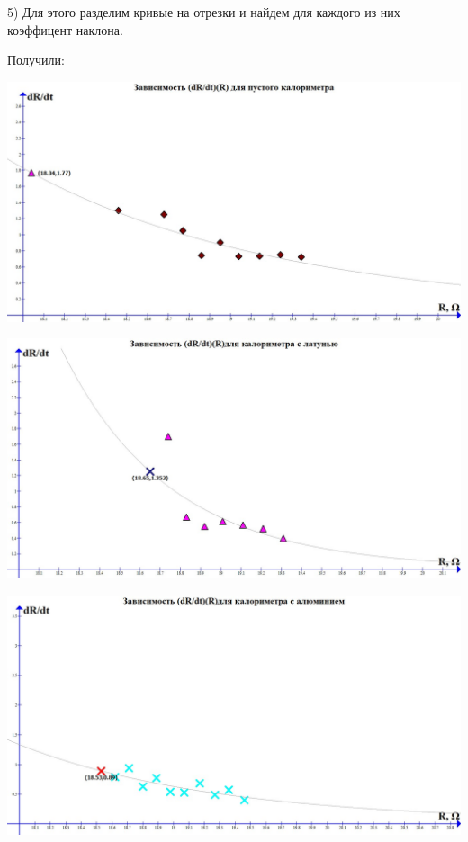 \documentclass[a4paper,12pt]{article} %
\begin{document}
5) Для этого разделим кривые на отрезки и найдем для каждого из них коэффицент наклона. 

Получили:\\[0.2cm]
\begin{center}
\includegraphics[scale=0.35]{2144}
\end{center}
\begin{center}
\includegraphics[scale=0.35]{2145}
\end{center}
\begin{center}
\includegraphics[scale=0.35]{2146}
\end{center}
\end{document}
